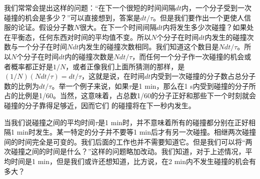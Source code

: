 我们常常会提出这样的问题：“在下一个很短的时间间隔$dt$内，一个分子受到一次碰撞的机会是多少？”可以直接想到，答案是$dt/\tau$。但是我们要作出一个更使人信服的论证。假设分子数$N$很大。在下一个时间间隔$dt$内将发生多少次碰撞？如果处在平衡态，任何东西对时间的平均值不变。所以$N$个分子在时间$dt$内发生的碰撞次数与一个分子在时间$N dt$内发生的碰撞次数相同。我们知道这个数目是$Ndt/\tau$。所以$N$个分子在时间$dt$内的碰撞次数是$Ndt/\tau$，而任何一个分子作一次碰撞的机会或者概率都正好是$1/N$，或者正像我们上面所猜测的那样，是$(1/N)(N dt /\tau)=dt/\tau$，这就是说，在时间$dt$内受到一次碰撞的分子数占总分子数的比例为$dt /\tau$。举一个例子来说，如果$\tau$是1 min，那么在1 s内受到碰撞的分子所占的比例是1/60。当然，这意味着，占总数1/60的分子正好和那些下一个时刻就会碰撞的分子靠得足够近，因而它们 的碰撞将在下一秒内发生。

当我们说碰撞之间的平均时间$\tau$是1 min时，并不意味着所有的碰撞都分别在正好相隔1 min时发生。某一特定的分子并不要等1 min后才有另一次碰撞。相继两次碰撞间的时间完全是可变的。我们后面的工作也并不需要知道它。但是我们可以将“两次碰撞之间的时间是什么？”这样的问题略加改动。我们知道，对于上述情况，平均时间是1 min，但是我们或许还想知道，比方说，在2 min内不发生碰撞的机会有多大？

